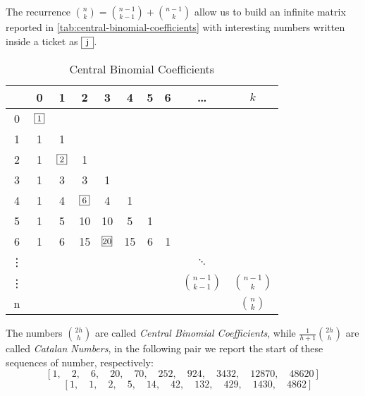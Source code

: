The recurrence $ {{n}\choose{k}} = {{n-1}\choose{k-1}} +
{{n-1}\choose{k}}$ allow us to build an infinite matrix reported in
\autoref{tab:central-binomial-coefficients} with interesting numbers
written inside a ticket as $\ticket{j}$.
\begin{table}[ht]
  \caption{Central Binomial Coefficients}
  \label{tab:central-binomial-coefficients}
  \begin{center}
    \begin{tabular}{c|ccccccccc}
      & 0 & 1 & 2 & 3 & 4 & 5 & 6 & \ldots & $k$ \\
      \hline
      0 & $\ticket{1}$ &  &  &  & & &  &  &\\
      1 & 1 & 1 &  &  & & & && \\
      2 & 1 & $\ticket{2}$ & 1 &  & & & && \\
      3 & 1 & 3 & 3 & 1 &  & &&&  \\
      4 & 1 & 4 & $\ticket{6}$ & 4 & 1 & &&&  \\
      5 & 1 & 5 & 10 & 10 & 5 & 1&&&  \\
      6 & 1 & 6 & 15 & $\ticket{20}$ & 15 & 6& 1&&  \\
      \vdots&  &  &  &  &  & &&$\ddots$&  \\
      \vdots&  && & & & &  & ${{n-1}\choose{k-1}} $  & ${{n-1}\choose{k}} $  \\
      n&  &  & &  & &&  & & ${{n}\choose{k}} $ \\
    \end{tabular}
  \end{center}
\end{table}
The numbers ${{2h}\choose{h}}$ are called \emph{Central Binomial
  Coefficients}, while $ \frac{1}{h+1}{{2h}\choose{h}}$ are called
\emph{Catalan Numbers}, in the following pair we report the start of
these sequences of number, respectively:
$$ \left [ 1, \quad 2, \quad 6, \quad 20, \quad 70, \quad 252, \quad 924, \quad 3432, \quad 12870, \quad 48620\right ] $$
$$\quad \left [ 1, \quad 1, \quad 2, \quad 5, \quad 14, \quad 42, \quad 132, \quad 429, \quad 1430, \quad 4862\right ] $$

